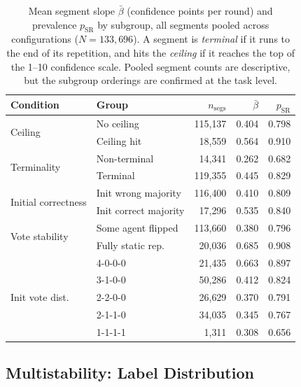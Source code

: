 \begin{table}[H]
\centering
\small
\begin{tabular}{llrrr}
\toprule
Condition & Group & $n_{\mathrm{segs}}$ & $\bar\beta$ & $p_{\mathrm{SR}}$ \\
\midrule
\multirow{2}{*}{Ceiling}
  & No ceiling   & 115{,}137 & 0.404 & 0.798 \\
  & Ceiling hit  &  18{,}559 & 0.564 & 0.910 \\
\midrule
\multirow{2}{*}{Terminality}
  & Non-terminal &  14{,}341 & 0.262 & 0.682 \\
  & Terminal     & 119{,}355 & 0.445 & 0.829 \\
\midrule
\multirow{2}{*}{Initial correctness}
  & Init wrong majority   & 116{,}400 & 0.410 & 0.809 \\
  & Init correct majority &  17{,}296 & 0.535 & 0.840 \\
\midrule
\multirow{2}{*}{Vote stability}
  & Some agent flipped    & 113{,}660 & 0.380 & 0.796 \\
  & Fully static rep.     &  20{,}036 & 0.685 & 0.908 \\
\midrule
\multirow{5}{*}{Init vote dist.}
  & 4-0-0-0 & 21{,}435 & 0.663 & 0.897 \\
  & 3-1-0-0 & 50{,}286 & 0.412 & 0.824 \\
  & 2-2-0-0 & 26{,}629 & 0.370 & 0.791 \\
  & 2-1-1-0 & 34{,}035 & 0.345 & 0.767 \\
  & 1-1-1-1 &  1{,}311 & 0.308 & 0.656 \\
\bottomrule
\end{tabular}
\caption[Self-reinforcement slope by structural subgroup]{Mean segment slope
         $\bar\beta$ (confidence points per round) and prevalence
         $p_{\mathrm{SR}}$ by subgroup, all segments pooled across configurations
         ($N = 133{,}696$). A segment is \emph{terminal} if it runs to the end of
         its repetition, and hits the \emph{ceiling} if it reaches the top of the
         1--10 confidence scale. Pooled segment counts are descriptive, but the
         subgroup orderings are confirmed at the task level.}
\label{tab:sr:subgroups}
\end{table}

\subsection{Multistability: Label Distribution}
\label{app:multistab}


